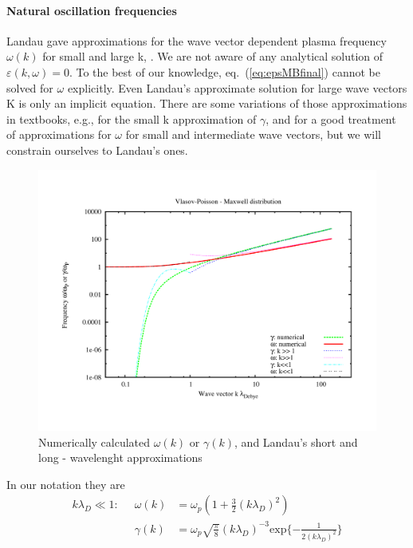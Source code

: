\documentclass[physics,phd,nolot,nolof]{uccthesis}%
\begin{document}
\paragraph*{Natural oscillation frequencies}
Landau gave approximations for the wave vector dependent plasma frequency $\omega(k)$ for small and large k, \cite{Landaudamping1946}.
We are not aware of any analytical solution of $\varepsilon(k,\omega)=0$. To the best of our knowledge, eq.~(\ref{eq:epsMBfinal}) 
cannot be solved for $\omega$ explicitly. 
Even Landau's approximate solution for large wave vectors K is only an implicit equation. 
There are some variations of those approximations in textbooks, e.g.,\cite{boydsanderson} for the small k approximation of $\gamma$, and \cite{bittencourtplasmafundamentals} for a good treatment of approximations for $\omega$ for small and intermediate wave vectors, but we will constrain ourselves to Landau's ones. 
\begin{figure}[h]
	\begin{center}
	\includegraphics[width=\textwidth]{approx.pdf}
	\end{center}
	\caption{Numerically calculated $\omega(k)$ or $\gamma(k)$, and Landau's short and long - wavelenght approximations}
	\label{fig:approxomegagamma}
\end{figure}
In our notation they are
\begin{eqnarray}
k\lambda_D \ll 1:\;\; 
& \omega(k)&=\omega_p(1+\frac{3}{2}(k\lambda_D)^2)\\
& \gamma(k)&=\omega_p \sqrt{\frac{\pi}{8}}(k\lambda_D)^{-3} \text{exp}\{ -\frac{1}{2(k\lambda_D)^2}\}
	\label{eq:approxsmallk}
\end{eqnarray}
\end{document}
